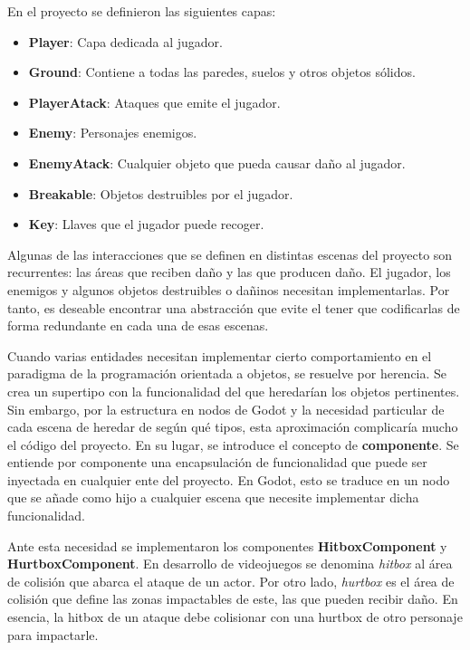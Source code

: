 En el proyecto se definieron las siguientes capas:

\begin{itemize}
    \item \textbf{Player}: Capa dedicada al jugador.
    \item \textbf{Ground}: Contiene a todas las paredes, suelos y otros objetos sólidos.
    \item \textbf{PlayerAtack}: Ataques que emite el jugador.
    \item \textbf{Enemy}: Personajes enemigos.
    \item \textbf{EnemyAtack}: Cualquier objeto que pueda causar daño al jugador.
    \item \textbf{Breakable}: Objetos destruibles por el jugador.
    \item \textbf{Key}: Llaves que el jugador puede recoger.
\end{itemize}

Algunas de las interacciones que se definen en distintas escenas del proyecto son recurrentes: las áreas que reciben daño y las que producen daño. El jugador, los enemigos y algunos objetos destruibles o dañinos necesitan implementarlas. Por tanto, es deseable encontrar una abstracción que evite el tener que codificarlas de forma redundante en cada una de esas escenas.

Cuando varias entidades necesitan implementar cierto comportamiento en el paradigma de la programación orientada a objetos, se resuelve por herencia. Se crea un supertipo con la funcionalidad del que heredarían los objetos pertinentes. Sin embargo, por la estructura en nodos de Godot y la necesidad particular de cada escena de heredar de según qué tipos, esta aproximación complicaría mucho el código del proyecto. En su lugar, se introduce el concepto de \textbf{componente}. Se entiende por componente una encapsulación de funcionalidad que puede ser inyectada en cualquier ente del proyecto. En Godot, esto se traduce en un nodo que se añade como hijo a cualquier escena que necesite implementar dicha funcionalidad.

Ante esta necesidad se implementaron los componentes \textbf{HitboxComponent} y \textbf{HurtboxComponent}. En desarrollo de videojuegos se denomina \textit{hitbox} al área de colisión que abarca el ataque de un actor. Por otro lado, \textit{hurtbox} es el área de colisión que define las zonas impactables de este, las que pueden recibir daño. En esencia, la hitbox de un ataque debe colisionar con una hurtbox de otro personaje para impactarle.

